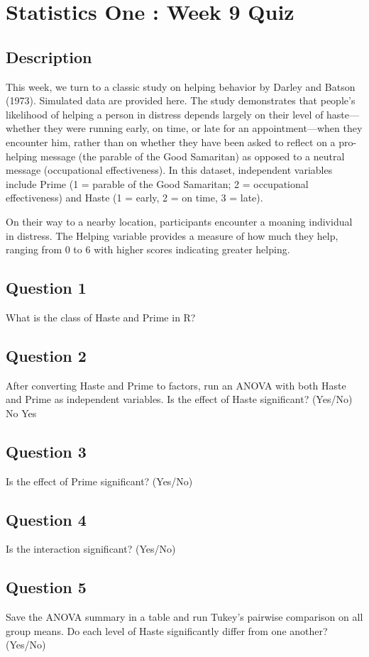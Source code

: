 \documentclass[12pt]{article}
\begin{document}
\section{Statistics One : Week 9 Quiz}
\subsection*{Description}
This week, we turn to a classic study on helping behavior by Darley and Batson (1973). Simulated data are provided here. The study demonstrates that people’s likelihood of helping a person in distress depends largely on their level of haste—whether they were running early, on time, or late for an appointment—when they encounter him, rather than on whether they have been asked to reflect on a pro-helping message (the parable of the Good Samaritan) as opposed to a neutral message (occupational effectiveness). In this dataset, independent variables include Prime (1 = parable of the Good Samaritan; 2 = occupational effectiveness) and Haste (1 = early, 2 = on time, 3 = late). 

On their way to a nearby location, participants encounter a moaning individual in distress. The Helping variable provides a measure of how much they help, ranging from 0 to 6 with higher scores indicating greater helping.

\subsection*{Question 1}
What is the class of Haste and Prime in R?


\subsection*{Question 2}
After converting Haste and Prime to factors, run an ANOVA with both Haste and Prime as independent variables. Is the effect of Haste significant? (Yes/No)
No
Yes
\subsection*{Question 3}
Is the effect of Prime significant? (Yes/No)
\subsection*{Question 4}
Is the interaction significant? (Yes/No)

\subsection*{Question 5}
Save the ANOVA summary in a table and run Tukey's pairwise comparison on all group means. Do each level of Haste significantly differ from one another? (Yes/No)
\end{document}
